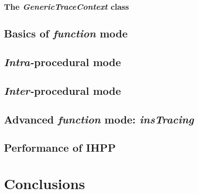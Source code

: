 \documentclass[a4paper,11pt]{report}
\begin{document}
\subsection{The \emph{GenericTraceContext} class}

\section{Basics of \emph{function} mode}

\section{\emph{Intra-}procedural mode}

\section{\emph{Inter-}procedural mode}

\section{Advanced \emph{function} mode: \emph{insTracing}}

\section{Performance of IHPP}

\chapter{Conclusions}

{}

\end{document}
